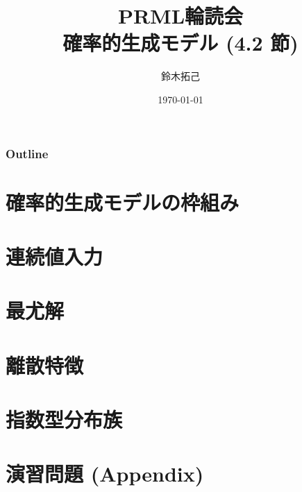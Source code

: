 \documentclass[uplatex,11pt,dvipdfmx,aspectratio=169,unicode,t]{beamer}
\title{PRML輪読会\\確率的生成モデル (4.2 節)}
\author{鈴木拓己}
\institute{}
\date{\today}
\numberwithin{equation}{section}
\newcommand{\1}{\bs{1}}
\newcommand{\0}{\bs{0}}
\begin{document}
\begin{frame}[plain]
    \titlepage
\end{frame}

\begin{frame}\frametitle{Outline}
    \tableofcontents
\end{frame}

\section{確率的生成モデルの枠組み}

\section{連続値入力}

\section{最尤解}

\section{離散特徴}

\section{指数型分布族}

\section{演習問題 (Appendix)}
\end{document}
